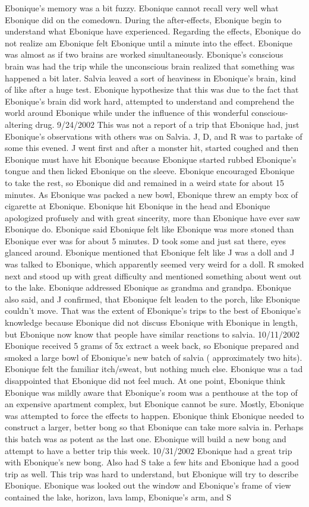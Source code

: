 \documentclass[12pt]{book}
\begin{document}
Ebonique's memory was a bit fuzzy. Ebonique cannot recall very well what Ebonique did on the comedown. During the after-effects, Ebonique begin to understand what Ebonique have experienced. Regarding the effects, Ebonique do not realize am Ebonique felt Ebonique until a minute into the effect. Ebonique was almost as if two brains are worked simultaneously. Ebonique's conscious brain was had the trip while the unconscious brain realized that something was happened a bit later. Salvia leaved a sort of heaviness in Ebonique's brain, kind of like after a huge test. Ebonique hypothesize that this was due to the fact that Ebonique's brain did work hard, attempted to understand and comprehend the world around Ebonique while under the influence of this wonderful conscious-altering drug. 9/24/2002 This was not a report of a trip that Ebonique had, just Ebonique's observations with others was on Salvia. J, D, and R was to partake of some this evened. J went first and after a monster hit, started coughed and then Ebonique must have hit Ebonique because Ebonique started rubbed Ebonique's tongue and then licked Ebonique on the sleeve. Ebonique encouraged Ebonique to take the rest, so Ebonique did and remained in a weird state for about 15 minutes. As Ebonique was packed a new bowl, Ebonique threw an empty box of cigarette at Ebonique. Ebonique hit Ebonique in the head and Ebonique apologized profusely and with great sincerity, more than Ebonique have ever saw Ebonique do. Ebonique said Ebonique felt like Ebonique was more stoned than Ebonique ever was for about 5 minutes. D took some and just sat there, eyes glanced around. Ebonique mentioned that Ebonique felt like J was a doll and J was talked to Ebonique, which apparently seemed very weird for a doll. R smoked next and stood up with great difficulty and mentioned something about went out to the lake. Ebonique addressed Ebonique as grandma and grandpa. Ebonique also said, and J confirmed, that Ebonique felt leaden to the porch, like Ebonique couldn't move. That was the extent of Ebonique's trips to the best of Ebonique's knowledge because Ebonique did not discuss Ebonique with Ebonique in length, but Ebonique now know that people have similar reactions to salvia. 10/11/2002 Ebonique received 5 grams of 5x extract a week back, so Ebonique prepared and smoked a large bowl of Ebonique's new batch of salvia ( approximately two hits). Ebonique felt the familiar itch/sweat, but nothing much else. Ebonique was a tad disappointed that Ebonique did not feel much. At one point, Ebonique think Ebonique was mildly aware that Ebonique's room was a penthouse at the top of an expensive apartment complex, but Ebonique cannot be sure. Mostly, Ebonique was attempted to force the effects to happen. Ebonique think Ebonique needed to construct a larger, better bong so that Ebonique can take more salvia in. Perhaps this batch was as potent as the last one. Ebonique will build a new bong and attempt to have a better trip this week. 10/31/2002 Ebonique had a great trip with Ebonique's new bong. Also had S take a few hits and Ebonique had a good trip as well. This trip was hard to understand, but Ebonique will try to describe Ebonique. Ebonique was looked out the window and Ebonique's frame of view contained the lake, horizon, lava lamp, Ebonique's arm, and S 
\end{document}
